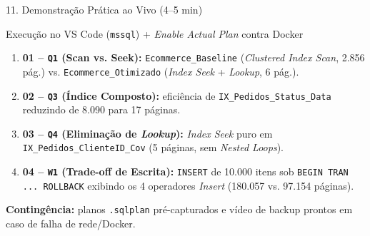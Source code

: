 \documentclass[aspectratio=169,11pt]{beamer}
\begin{document}
\begin{frame}{11. Demonstração Prática ao Vivo (4–5 min)}
  \begin{block}{Execução no VS Code (\texttt{mssql}) + \textit{Enable Actual Plan} contra Docker}
    \begin{enumerate}
      \item \textbf{01 -- \texttt{Q1} (Scan vs. Seek):} \texttt{Ecommerce\_Baseline} (\textit{Clustered Index Scan}, 2.856 pág.) vs. \texttt{Ecommerce\_Otimizado} (\textit{Index Seek} + \textit{Lookup}, 6 pág.).
      \item \textbf{02 -- \texttt{Q3} (Índice Composto):} eficiência de \texttt{IX\_Pedidos\_Status\_Data} reduzindo de 8.090 para 17 páginas.
      \item \textbf{03 -- \texttt{Q4} (Eliminação de \textit{Lookup}):} \textit{Index Seek} puro em \texttt{IX\_Pedidos\_ClienteID\_Cov} (5 páginas, sem \textit{Nested Loops}).
      \item \textbf{04 -- \texttt{W1} (Trade-off de Escrita):} \texttt{INSERT} de 10.000 itens sob \texttt{BEGIN TRAN ... ROLLBACK} exibindo os 4 operadores \textit{Insert} (180.057 vs. 97.154 páginas).
    \end{enumerate}
  \end{block}
  \footnotesize \textbf{Contingência:} planos \texttt{.sqlplan} pré-capturados e vídeo de backup prontos em caso de falha de rede/Docker.
\end{frame}
\end{document}
